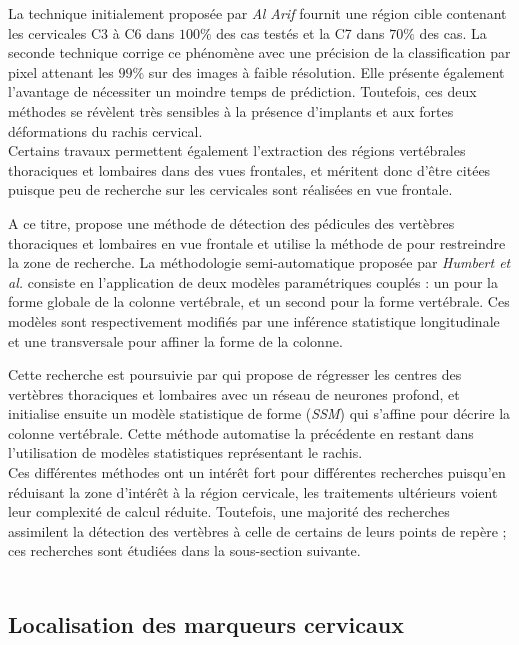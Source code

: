         La technique initialement proposée par {\itshape Al Arif} fournit une région cible contenant les cervicales C3 à C6 dans $100\%$ des cas testés et la C7 dans $70\%$ des cas. La seconde technique corrige ce phénomène avec une précision de la classification par pixel attenant les $99\%$ sur des images à faible résolution. Elle présente également l'avantage de nécessiter un moindre temps de prédiction. Toutefois, ces deux méthodes se révèlent très sensibles à la présence d'implants et aux fortes déformations du rachis cervical.
        \\

        Certains travaux permettent également l'extraction des régions vertébrales thoraciques et lombaires dans des vues frontales, et méritent donc d'être citées puisque peu de recherche sur les cervicales sont réalisées en vue frontale.

        A ce titre, \cite{Ebrahimi2018} propose une méthode de détection des pédicules des vertèbres thoraciques et lombaires en vue frontale et utilise la méthode de \cite{Humbert2009} pour restreindre la zone de recherche. La méthodologie semi-automatique proposée par {\itshape Humbert et al.} consiste en l'application de deux modèles paramétriques couplés : un pour la forme globale de la colonne vertébrale, et un second pour la forme vertébrale. Ces modèles sont respectivement modifiés par une inférence statistique \og longitudinale \fg et une \og transversale \fg pour affiner la forme de la colonne.

        Cette recherche est poursuivie par \cite{Aubert2016} qui propose de régresser les centres des vertèbres thoraciques et lombaires avec un réseau de neurones profond, et initialise ensuite un modèle statistique de forme ({\itshape SSM}) qui s'affine pour décrire la colonne vertébrale. Cette méthode automatise la précédente en restant dans l'utilisation de modèles statistiques représentant le rachis.
        \\

        Ces différentes méthodes ont un intérêt fort pour différentes recherches puisqu'en réduisant la zone d'intérêt à la région cervicale, les traitements ultérieurs voient leur complexité de calcul réduite. Toutefois, une majorité des recherches assimilent la détection des vertèbres à celle de certains de leurs points de repère ; ces recherches sont étudiées dans la sous-section suivante.
        \\\\

    \subsection{Localisation des marqueurs cervicaux}

